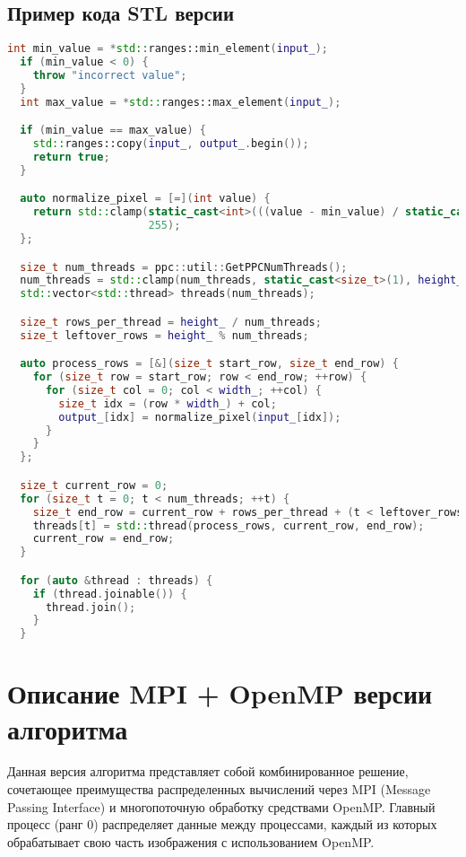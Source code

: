 \documentclass[14pt,a4paper]{extarticle}
\begin{document}
\subsection*{Пример кода STL версии}
\begin{lstlisting}[language=C++]
int min_value = *std::ranges::min_element(input_);
  if (min_value < 0) {
    throw "incorrect value";
  }
  int max_value = *std::ranges::max_element(input_);

  if (min_value == max_value) {
    std::ranges::copy(input_, output_.begin());
    return true;
  }

  auto normalize_pixel = [=](int value) {
    return std::clamp(static_cast<int>(((value - min_value) / static_cast<double>(max_value - min_value)) * 255), 0,
                      255);
  };

  size_t num_threads = ppc::util::GetPPCNumThreads();
  num_threads = std::clamp(num_threads, static_cast<size_t>(1), height_);
  std::vector<std::thread> threads(num_threads);

  size_t rows_per_thread = height_ / num_threads;
  size_t leftover_rows = height_ % num_threads;

  auto process_rows = [&](size_t start_row, size_t end_row) {
    for (size_t row = start_row; row < end_row; ++row) {
      for (size_t col = 0; col < width_; ++col) {
        size_t idx = (row * width_) + col;
        output_[idx] = normalize_pixel(input_[idx]);
      }
    }
  };

  size_t current_row = 0;
  for (size_t t = 0; t < num_threads; ++t) {
    size_t end_row = current_row + rows_per_thread + (t < leftover_rows ? 1 : 0);
    threads[t] = std::thread(process_rows, current_row, end_row);
    current_row = end_row;
  }

  for (auto &thread : threads) {
    if (thread.joinable()) {
      thread.join();
    }
  }
\end{lstlisting}

\section{Описание MPI + OpenMP версии алгоритма}

Данная версия алгоритма представляет собой комбинированное решение, сочетающее преимущества распределенных вычислений через MPI (Message Passing Interface) и многопоточную обработку средствами OpenMP. Главный процесс (ранг 0) распределяет данные между процессами, каждый из которых обрабатывает свою часть изображения с использованием OpenMP.
\end{document}
